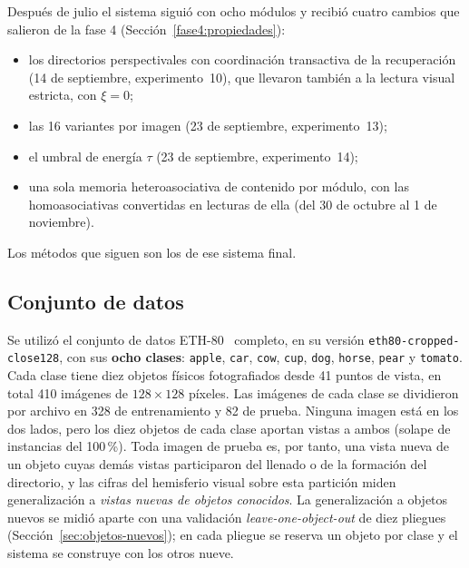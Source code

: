 Después de julio el sistema siguió con ocho módulos y recibió cuatro cambios que salieron
de la fase 4 (Sección~\ref{fase4:propiedades}):
\begin{itemize}
    \item los directorios perspectivales con coordinación transactiva de la recuperación
    (14 de septiembre, experimento~10), que llevaron también a la lectura visual estricta,
    con $\xi = 0$;
    \item las 16 variantes por imagen (23 de septiembre, experimento~13);
    \item el umbral de energía $\tau$ (23 de septiembre, experimento~14);
    \item una sola memoria heteroasociativa de contenido por módulo, con las
    homoasociativas convertidas en lecturas de ella (del 30 de octubre al 1 de noviembre).
\end{itemize}
Los métodos que siguen son los de ese sistema final.

\subsection{Conjunto de datos}
\label{sec:dataset}

Se utilizó el conjunto de datos ETH-80~\cite{leibe2003eth80} completo, en su versión
\texttt{eth80-\allowbreak cropped-\allowbreak close128}, con sus
\textbf{ocho clases}: \texttt{apple}, \texttt{car}, \texttt{cow}, \texttt{cup},
\texttt{dog}, \texttt{horse}, \texttt{pear} y \texttt{tomato}.
Cada clase tiene diez objetos físicos fotografiados desde 41 puntos de vista, en total
410 imágenes de $128\times128$ píxeles.
Las imágenes de cada clase se dividieron por archivo en 328 de entrenamiento y 82 de
prueba. Ninguna imagen está en los dos lados, pero los diez objetos de cada clase
aportan vistas a ambos (solape de instancias del 100\,\%).
Toda imagen de prueba es, por tanto, una vista nueva de un objeto cuyas demás vistas
participaron del llenado o de la formación del directorio, y las cifras del hemisferio
visual sobre esta partición miden generalización a \emph{vistas nuevas de objetos
conocidos}.
La generalización a objetos nuevos se midió aparte con una validación
\textit{leave-one-object-out} de diez pliegues (Sección~\ref{sec:objetos-nuevos}); en
cada pliegue se reserva un objeto por clase y el sistema se construye con los otros
nueve.

